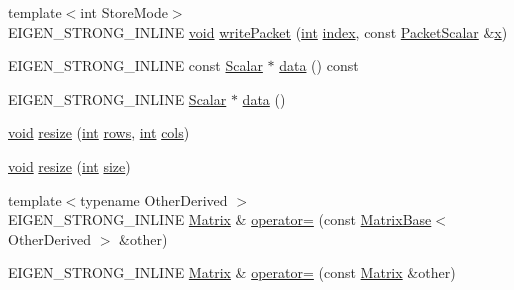 \begin{DoxyCompactItemize}
\item 
{\footnotesize template$<$int Store\-Mode$>$ }\\E\-I\-G\-E\-N\-\_\-\-S\-T\-R\-O\-N\-G\-\_\-\-I\-N\-L\-I\-N\-E \hyperlink{group___u_a_v_objects_plugin_ga444cf2ff3f0ecbe028adce838d373f5c}{void} \hyperlink{class_matrix_a0ce7040d39e12df23ca25420467b35d0}{write\-Packet} (\hyperlink{ioapi_8h_a787fa3cf048117ba7123753c1e74fcd6}{int} \hyperlink{glext_8h_ab47dd9958bcadea08866b42bf358e95e}{index}, const \hyperlink{class_matrix_base_a58f32cd6a06433ee7a60efa03e99183a}{Packet\-Scalar} \&\hyperlink{glext_8h_a1db9d104e3c2128177f26aff7b46982f}{x})
\item 
E\-I\-G\-E\-N\-\_\-\-S\-T\-R\-O\-N\-G\-\_\-\-I\-N\-L\-I\-N\-E const \hyperlink{class_matrix_base_a625df8339dc2d816cbc0fd66e7dadaf5}{Scalar} $\ast$ \hyperlink{class_matrix_a842e8aeb7822e4b1b5819639de400485}{data} () const 
\item 
E\-I\-G\-E\-N\-\_\-\-S\-T\-R\-O\-N\-G\-\_\-\-I\-N\-L\-I\-N\-E \hyperlink{class_matrix_base_a625df8339dc2d816cbc0fd66e7dadaf5}{Scalar} $\ast$ \hyperlink{class_matrix_ae48394560bfbbb40562b385af016df9e}{data} ()
\item 
\hyperlink{group___u_a_v_objects_plugin_ga444cf2ff3f0ecbe028adce838d373f5c}{void} \hyperlink{class_matrix_a021967e3c6c3fd8af70fa9df7bc46522}{resize} (\hyperlink{ioapi_8h_a787fa3cf048117ba7123753c1e74fcd6}{int} \hyperlink{class_matrix_a5c0643ac5b12c576300a3c60899a61c9}{rows}, \hyperlink{ioapi_8h_a787fa3cf048117ba7123753c1e74fcd6}{int} \hyperlink{class_matrix_a6457e87782c95b003d23f8b8b90e6838}{cols})
\item 
\hyperlink{group___u_a_v_objects_plugin_ga444cf2ff3f0ecbe028adce838d373f5c}{void} \hyperlink{class_matrix_a5a896e70e4e21c9d5713d8d7fa4a4925}{resize} (\hyperlink{ioapi_8h_a787fa3cf048117ba7123753c1e74fcd6}{int} \hyperlink{glext_8h_a014d89bd76f74ef3a29c8f04b473eb76}{size})
\item 
{\footnotesize template$<$typename Other\-Derived $>$ }\\E\-I\-G\-E\-N\-\_\-\-S\-T\-R\-O\-N\-G\-\_\-\-I\-N\-L\-I\-N\-E \hyperlink{class_matrix}{Matrix} \& \hyperlink{class_matrix_afe308a699b127dcd3d0cc1431d9bdfdd}{operator=} (const \hyperlink{class_matrix_base}{Matrix\-Base}$<$ Other\-Derived $>$ \&other)
\item 
E\-I\-G\-E\-N\-\_\-\-S\-T\-R\-O\-N\-G\-\_\-\-I\-N\-L\-I\-N\-E \hyperlink{class_matrix}{Matrix} \& \hyperlink{class_matrix_a67552b2fbe2a3ed98dc1a4a7718bf610}{operator=} (const \hyperlink{class_matrix}{Matrix} \&other)
\item 

\end{DoxyCompactItemize}
